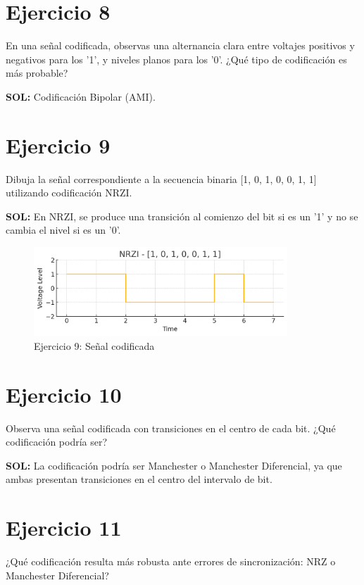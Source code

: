 \documentclass[a4paper,12pt]{article}
\begin{document}
\section*{Ejercicio 8}
En una señal codificada, observas una alternancia clara entre voltajes positivos y negativos para los '1', y niveles planos para los '0'. ¿Qué tipo de codificación es más probable?



\textbf{SOL:} Codificación Bipolar (AMI).



\section*{Ejercicio 9}
Dibuja la señal correspondiente a la secuencia binaria [1, 0, 1, 0, 0, 1, 1] utilizando codificación NRZI.



\textbf{SOL:} En NRZI, se produce una transición al comienzo del bit si es un '1' y no se cambia el nivel si es un '0'.

\begin{figure}[h!]
\centering
\includegraphics[width=0.85\textwidth]{img/ejercicio_9.png}
\caption{Ejercicio 9: Señal codificada}
\end{figure}
\clearpage


\section*{Ejercicio 10}
Observa una señal codificada con transiciones en el centro de cada bit. ¿Qué codificación podría ser?



\textbf{SOL:} La codificación podría ser Manchester o Manchester Diferencial, ya que ambas presentan transiciones en el centro del intervalo de bit.



\section*{Ejercicio 11}
¿Qué codificación resulta más robusta ante errores de sincronización: NRZ o Manchester Diferencial?
\end{document}
